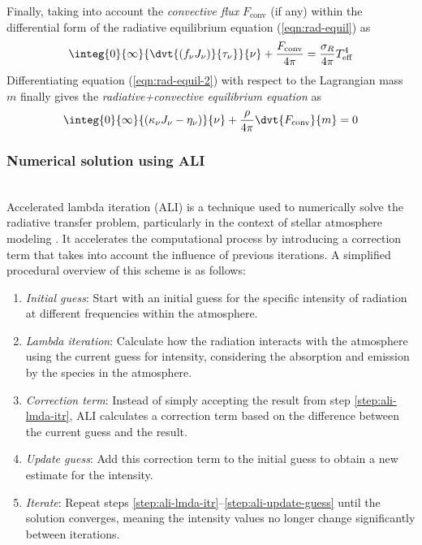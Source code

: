 		Finally, taking into account the \textit{convective flux} $F_\text{conv}$ (if any) within the differential form of the radiative equilibrium equation (\ref{eqn:rad-equil}) as
		\begin{align}
			\integ{0}{\infty}{\dvt{(f_\nu J_\nu)}{\tau_\nu}}{\nu}+\dfrac{F_\text{conv}}{4\pi}=\dfrac{\sigma_R}{4\pi}T_\text{eff}^4 \label{eqn:rad-equil-2}
		\end{align}
		Differentiating equation (\ref{eqn:rad-equil-2}) with respect to the Lagrangian mass $m$ finally gives the \textit{radiative+convective equilibrium equation} as
		\begin{align}
			\integ{0}{\infty}{(\kappa_\nu J_\nu-\eta_\nu)}{\nu}+\dfrac{\rho}{4\pi}\dvt{F_\text{conv}}{m}=0 \label{eqn:rad-conv-equil}
		\end{align}
		
		\subsubsection{Numerical solution using ALI}
		\quad\\
		Accelerated lambda iteration (ALI) is a technique used to numerically solve the radiative transfer problem, particularly in the context of stellar atmosphere modeling \cite{hubeny2003accelerated}. It accelerates the computational process by introducing a correction term that takes into account the influence of previous iterations. A simplified procedural overview of this scheme is as follows:
		\begin{enumerate}
			\item \textit{Initial guess}: Start with an initial guess for the specific intensity of radiation at different frequencies within the atmosphere. \label{step:ali-init-guess}
			\item \textit{Lambda iteration}: Calculate how the radiation interacts with the atmosphere using the current guess for intensity, considering the absorption and emission by the species in the atmosphere. \label{step:ali-lmda-itr}
			\item \textit{Correction term}: Instead of simply accepting the result from step \ref{step:ali-lmda-itr}, ALI calculates a correction term based on the difference between the current guess and the result. \label{step:ali-corr-term}
			\item \textit{Update guess}: Add this correction term to the initial guess to obtain a new estimate for the intensity. \label{step:ali-update-guess}
			\item \textit{Iterate}: Repeat steps \ref{step:ali-lmda-itr}--\ref{step:ali-update-guess} until the solution converges, meaning the intensity values no longer change significantly between iterations. \label{step:ali-iterate}
		\end{enumerate}
		
